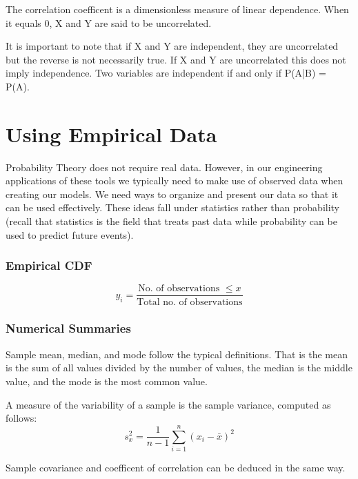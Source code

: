 The correlation coefficent is a dimensionless measure of linear dependence. When it equals 0, X and Y are said to be uncorrelated. 

It is important to note that if X and Y are independent, they are uncorrelated but the reverse is not necessarily true. If X and Y are uncorrelated this does not imply independence. Two variables are independent if and only if P(A|B) = P(A).

\section{Using Empirical Data}
Probability Theory does not require real data. However, in our engineering applications of these tools we typically need to make use of observed data when creating our models. We need ways to organize and present our data so that it can be used effectively. These ideas fall under statistics rather than probability (recall that statistics is the field that treats past data while probability can be used to predict future events).

\subsubsection*{Empirical CDF}
\[
    y_i = \frac{\text{No. of observations }\le x}{\text{Total no. of observations}}  
\]

\subsubsection*{Numerical Summaries}
Sample mean, median, and mode follow the typical definitions. That is the mean is the sum of all values divided by the number of values, the median is the middle value, and the mode is the most common value.

A measure of the variability of a sample is the sample variance, computed as follows:
\[
    s_x^2 = \frac{1}{n - 1} \sum_{i = 1}^{n}(x_i - \bar{x})^2
\]

Sample covariance and coefficent of correlation can be deduced in the same way.